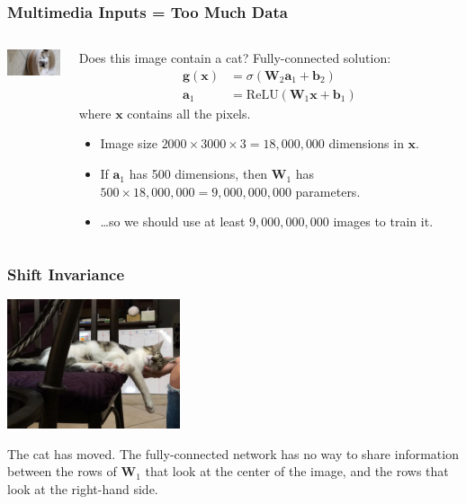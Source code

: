 \documentclass{beamer}
\begin{document}
\begin{frame}
  \frametitle{Multimedia Inputs = Too Much Data}
  \begin{columns}[t]
    \column{1in}
    \begin{block}{}
      \centerline{\includegraphics[width=0.8in]{figs/kitten.jpg}}
    \end{block}
    \column{3.5in}
    \begin{block}{Does this image contain a  cat?}
      Fully-connected solution:
      \begin{align*}
        \mathbf{g}(\mathbf{x}) &=\sigma\left(\mathbf{W}_{2}\mathbf{a}_1+\mathbf{b}_2\right)\\
        \mathbf{a}_1 &= \mbox{ReLU}\left(\mathbf{W}_{1}\mathbf{x}+\mathbf{b}_1\right)
      \end{align*}
      where $\mathbf{x}$ contains all the pixels.
      \begin{itemize}
      \item Image size $2000\times 3000\times 3=18,000,000$ dimensions in $\mathbf{x}$.
      \item If $\mathbf{a}_1$ has 500 dimensions, then $\mathbf{W}_{1}$ has
        $500\times 18,000,000=9,000,000,000$ parameters.
      \item \ldots so we should use at least $9,000,000,000$ images to train it.
      \end{itemize}
    \end{block}
  \end{columns}
\end{frame}

\begin{frame}
  \frametitle{Shift Invariance}
  \centerline{\includegraphics[height=1.5in]{figs/IMG-20200826-WA0000.jpg}}
    The cat has moved.  The fully-connected network has no way to
    share information between the rows of $\mathbf{W}_{1}$ that look at the
    center of the image, and the rows that look at the right-hand side.
\end{frame}
\end{document}
